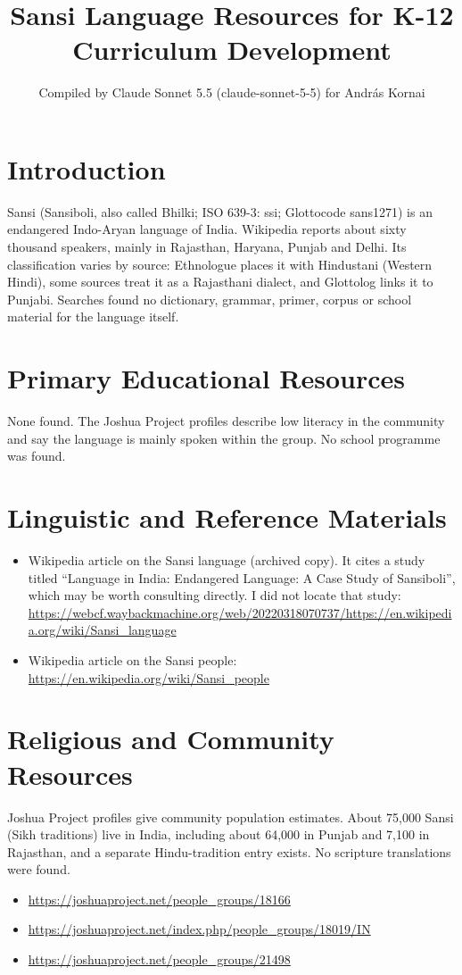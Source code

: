 \documentclass[12pt]{article}
\title{Sansi Language Resources for K-12 Curriculum Development}
\author{Compiled by Claude Sonnet 5.5 (claude-sonnet-5-5) for Andr\'as Kornai}
\date{}
\begin{document}
\maketitle

\section{Introduction}
Sansi (Sansiboli, also called Bhilki; ISO 639-3: ssi; Glottocode sans1271) is an endangered Indo-Aryan language of India. Wikipedia reports about sixty thousand speakers, mainly in Rajasthan, Haryana, Punjab and Delhi. Its classification varies by source: Ethnologue places it with Hindustani (Western Hindi), some sources treat it as a Rajasthani dialect, and Glottolog links it to Punjabi. Searches found no dictionary, grammar, primer, corpus or school material for the language itself.

\section{Primary Educational Resources}
None found. The Joshua Project profiles describe low literacy in the community and say the language is mainly spoken within the group. No school programme was found.

\section{Linguistic and Reference Materials}
\begin{itemize}
\item Wikipedia article on the Sansi language (archived copy). It cites a study titled ``Language in India: Endangered Language: A Case Study of Sansiboli'', which may be worth consulting directly. I did not locate that study: \url{https://webcf.waybackmachine.org/web/20220318070737/https://en.wikipedia.org/wiki/Sansi_language}
\item Wikipedia article on the Sansi people: \url{https://en.wikipedia.org/wiki/Sansi_people}
\end{itemize}

\section{Religious and Community Resources}
Joshua Project profiles give community population estimates. About 75,000 Sansi (Sikh traditions) live in India, including about 64,000 in Punjab and 7,100 in Rajasthan, and a separate Hindu-tradition entry exists. No scripture translations were found.
\begin{itemize}
\item \url{https://joshuaproject.net/people_groups/18166}
\item \url{https://joshuaproject.net/index.php/people_groups/18019/IN}
\item \url{https://joshuaproject.net/people_groups/21498}
\end{itemize}
\end{document}
